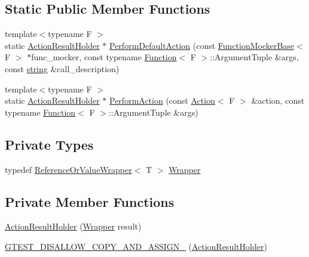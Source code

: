\subsection*{Static Public Member Functions}
\begin{DoxyCompactItemize}
\item 
{\footnotesize template$<$typename F $>$ }\\static \hyperlink{classtesting_1_1internal_1_1ActionResultHolder}{Action\+Result\+Holder} $\ast$ \hyperlink{classtesting_1_1internal_1_1ActionResultHolder_a9609dcb5fb16271f83d777b087075272}{Perform\+Default\+Action} (const \hyperlink{classtesting_1_1internal_1_1FunctionMockerBase}{Function\+Mocker\+Base}$<$ F $>$ $\ast$func\+\_\+mocker, const typename \hyperlink{structtesting_1_1internal_1_1Function}{Function}$<$ F $>$\+::Argument\+Tuple \&args, const \hyperlink{namespacetesting_1_1internal_a8e8ff5b11e64078831112677156cb111}{string} \&call\+\_\+description)
\item 
{\footnotesize template$<$typename F $>$ }\\static \hyperlink{classtesting_1_1internal_1_1ActionResultHolder}{Action\+Result\+Holder} $\ast$ \hyperlink{classtesting_1_1internal_1_1ActionResultHolder_a9e10aff754b5caf69b14964f3c9c79ec}{Perform\+Action} (const \hyperlink{classtesting_1_1Action}{Action}$<$ F $>$ \&action, const typename \hyperlink{structtesting_1_1internal_1_1Function}{Function}$<$ F $>$\+::Argument\+Tuple \&args)
\end{DoxyCompactItemize}
\subsection*{Private Types}
\begin{DoxyCompactItemize}
\item 
typedef \hyperlink{classtesting_1_1internal_1_1ReferenceOrValueWrapper}{Reference\+Or\+Value\+Wrapper}$<$ T $>$ \hyperlink{classtesting_1_1internal_1_1ActionResultHolder_aa483b488570efd86657857501dce2b1d}{Wrapper}
\end{DoxyCompactItemize}
\subsection*{Private Member Functions}
\begin{DoxyCompactItemize}
\item 
\hyperlink{classtesting_1_1internal_1_1ActionResultHolder_abd600b0ffabe799853682d791cb24c77}{Action\+Result\+Holder} (\hyperlink{classtesting_1_1internal_1_1ActionResultHolder_aa483b488570efd86657857501dce2b1d}{Wrapper} result)
\item 
\hyperlink{classtesting_1_1internal_1_1ActionResultHolder_a0c67599284185cab80182b1947847cfd}{G\+T\+E\+S\+T\+\_\+\+D\+I\+S\+A\+L\+L\+O\+W\+\_\+\+C\+O\+P\+Y\+\_\+\+A\+N\+D\+\_\+\+A\+S\+S\+I\+G\+N\+\_\+} (\hyperlink{classtesting_1_1internal_1_1ActionResultHolder}{Action\+Result\+Holder})
\end{DoxyCompactItemize}
